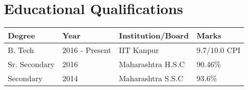 \setlength\extrarowheight{3pt}  %

\section*{Educational Qualifications}
\begin{tabularx}{\textwidth}{|L|L|L|L|}

\hline
\textbf{Degree} & \textbf{Year}  & \textbf{Institution/Board} & \textbf{Marks}\\
\hline
B. Tech         & 2016 - Present & IIT Kanpur                 & 9.7/10.0 CPI\\
Sr. Secondary   & 2016           & Maharashtra H.S.C          & 90.46\%\\
Secondary       & 2014           & Maharashtra S.S.C          & 93.6\%\\
\hline

\end{tabularx}
